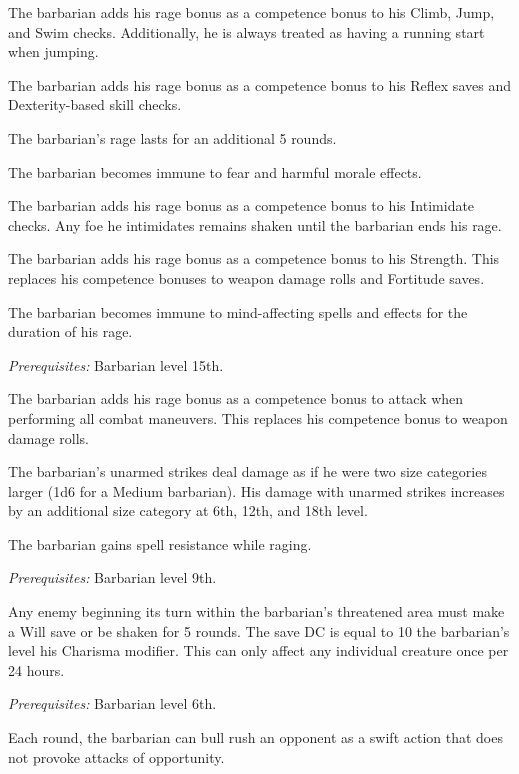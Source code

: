  The barbarian adds his rage bonus as a competence bonus to his Climb, Jump, and Swim checks. Additionally, he is always treated as having a running start when jumping.

 The barbarian adds his rage bonus as a competence bonus to his Reflex saves and Dexterity-based skill checks.

 The barbarian's rage lasts for an additional 5 rounds.

 The barbarian becomes immune to fear and harmful morale effects.

 The barbarian adds his rage bonus as a competence bonus to his Intimidate checks. Any foe he intimidates remains shaken until the barbarian ends his rage.

 The barbarian adds his rage bonus as a competence bonus to his Strength. This replaces his competence bonuses to weapon damage rolls and Fortitude saves.

 The barbarian becomes immune to mind-affecting spells and effects for the duration of his rage.

\textit{Prerequisites:} Barbarian level 15th.

 The barbarian adds his rage bonus as a competence bonus to attack when performing all combat maneuvers. This replaces his competence bonus to weapon damage rolls.

 The barbarian's unarmed strikes deal damage as if he were two size categories larger (1d6 for a Medium barbarian). His damage with unarmed strikes increases by an additional size category at 6th, 12th, and 18th level.

 The barbarian gains spell resistance while raging.

\textit{Prerequisites:} Barbarian level 9th.

 Any enemy beginning its turn within the barbarian's threatened area must make a Will save or be shaken for 5 rounds. The save DC is equal to 10 \add the barbarian's level \add his Charisma modifier. This can only affect any individual creature once per 24 hours.

\textit{Prerequisites:} Barbarian level 6th.

 Each round, the barbarian can bull rush an opponent as a swift action that does not provoke attacks of opportunity.


